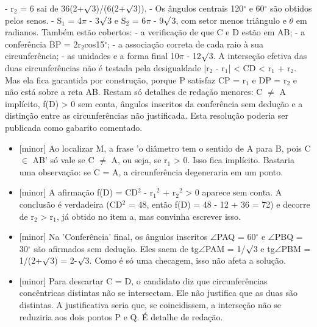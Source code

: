 \documentclass{article}%
\begin{document}
{-} r$_{2}$ = 6 sai de 36(2+$\surd$3)/(6(2+$\surd$3)).\newline%
{-} Os ângulos centrais 120$^\circ$ e 60$^\circ$ são obtidos pelos senos.\newline%
{-} S$_{1}$ = 4$\pi$ - 3$\surd$3 e S$_{2}$ = 6$\pi$ - 9$\surd$3, com setor menos triângulo e $\theta$ em radianos.\newline%
\newline%
Também estão cobertos:\newline%
{-} a verificação de que C e D estão em AB;\newline%
{-} a conferência BP = 2r$_{2}$cos15$^\circ$;\newline%
{-} a associação correta de cada raio à sua circunferência;\newline%
{-} as unidades e a forma final 10$\pi$ - 12$\surd$3.\newline%
\newline%
A interseção efetiva das duas circunferências não é testada pela desigualdade |r$_{2}$ - r$_{1}$| < CD < r$_{1}$ + r$_{2}$. Mas ela fica garantida por construção, porque P satisfaz CP = r$_{1}$ e DP = r$_{2}$ e não está sobre a reta AB.\newline%
\newline%
Restam só detalhes de redação menores: C $\neq$ A implícito, f(D) > 0 sem conta, ângulos inscritos da conferência sem dedução e a distinção entre as circunferências não justificada. Esta resolução poderia ser publicada como gabarito comentado.%
\begin{itemize}%
\item%
{[}minor{]} Ao localizar M, a frase 'o diâmetro tem o sentido de A para B, pois C $\in$ AB' só vale se C $\neq$ A, ou seja, se r$_{1}$ > 0. Isso fica implícito. Bastaria uma observação: se C = A, a circunferência degeneraria em um ponto.%
\item%
{[}minor{]} A afirmação f(D) = CD$^2$ - r$_{1}$$^2$ + r$_{2}$$^2$ > 0 aparece sem conta. A conclusão é verdadeira (CD$^2$ = 48, então f(D) = 48 - 12 + 36 = 72) e decorre de r$_{2}$ > r$_{1}$, já obtido no item a, mas convinha escrever isso.%
\item%
{[}minor{]} Na 'Conferência' final, os ângulos inscritos $\angle$PAQ = 60$^\circ$ e $\angle$PBQ = 30$^\circ$ são afirmados sem dedução. Eles saem de tg$\angle$PAM = 1/$\surd$3 e tg$\angle$PBM = 1/(2+$\surd$3) = 2-$\surd$3. Como é só uma checagem, isso não afeta a solução.%
\item%
{[}minor{]} Para descartar C = D, o candidato diz que circunferências concêntricas distintas não se intersectam. Ele não justifica que as duas são distintas. A justificativa seria que, se coincidissem, a interseção não se reduziria aos dois pontos P e Q. É detalhe de redação.%
\end{itemize}%
\end{document}
